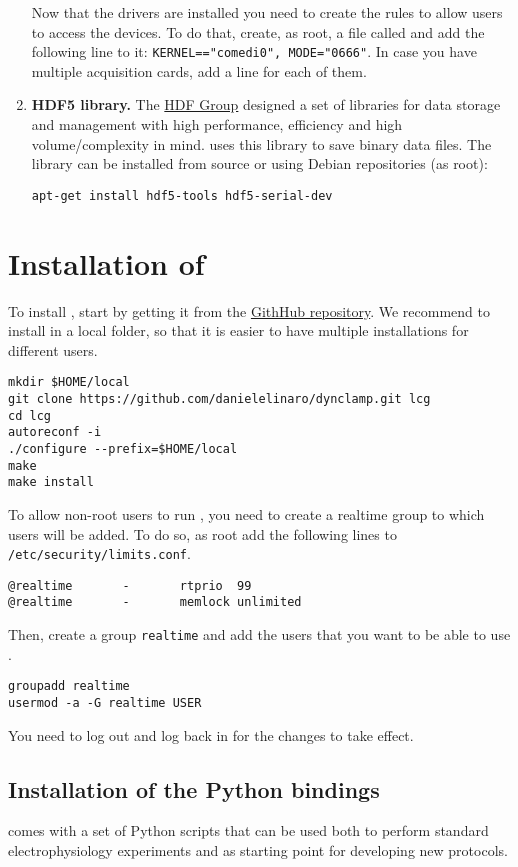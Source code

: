 \begin{enumerate}
Now that the drivers are installed you need to create the rules to
allow users to access the devices. To do that, create, as root, a file
called  and add the
following line to it: \texttt{KERNEL=="comedi0", MODE="0666"}. In case
you have multiple acquisition cards, add a line for each of them.
\item \textbf{HDF5 library.}
The \href{http://www.hdfgroup.org/HDF5/}{HDF Group} designed a set of
libraries for data storage and management with high performance,
efficiency and high volume/complexity in mind. \textbf{\progname} uses
this library to save binary data files. The
library can be installed from source or using Debian repositories
(as root):
\begin{lstlisting}
apt-get install hdf5-tools hdf5-serial-dev
\end{lstlisting}
\end{enumerate}

\section{Installation of \progname}
\label{install:program}
To install \progname, start by getting it from the
\href{https://github.com/danielelinaro/dynclamp}{GithHub
  repository}. We recommend to install \progname in a local folder, so
that it is easier to have multiple installations for different users.
\begin{lstlisting}
mkdir $HOME/local
git clone https://github.com/danielelinaro/dynclamp.git lcg
cd lcg
autoreconf -i
./configure --prefix=$HOME/local
make
make install
\end{lstlisting}

To allow non-root users to run \progname, you need to create a
realtime group to which users will be added. To do so, as root add
the following lines to \texttt{/etc/security/limits.conf}.
\begin{lstlisting}
@realtime       -       rtprio  99
@realtime       -       memlock unlimited
\end{lstlisting}
Then, create a group \texttt{realtime} and add the users that you want
to be able to use \progname.
\begin{lstlisting}
groupadd realtime
usermod -a -G realtime USER
\end{lstlisting}
You need to log out and log back in for the changes to take effect.

\subsection{Installation of the Python bindings}
\progname comes with a set of Python scripts that can be used both to
perform standard electrophysiology experiments and as starting point
for developing new protocols.

